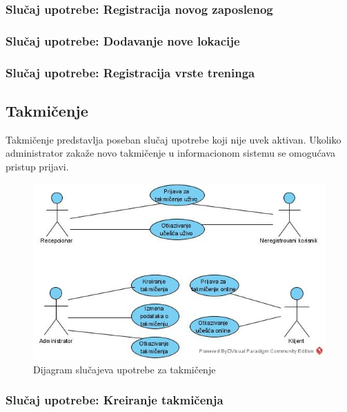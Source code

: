 \documentclass[a4paper]{article}
\begin{document}
\subsubsection{Slučaj upotrebe: Registracija novog zaposlenog}


\subsubsection{Slučaj upotrebe: Dodavanje nove lokacije}


\subsubsection{Slučaj upotrebe: Registracija vrste treninga}


\newpage
\subsection{Takmičenje}
Takmičenje predstavlja poseban slučaj upotrebe koji nije uvek aktivan. Ukoliko administrator zakaže novo takmičenje u informacionom sistemu se omogućava pristup prijavi. 

\begin{figure}[!ht]
\begin{center}
\includegraphics[scale=0.55]{sections/images/dijagram_slucajeva_upotrebe_za_takmicenje.jpg}
\end{center}
\caption{Dijagram slučajeva upotrebe za takmičenje}
\label{fig:kontekst}
\end{figure}

\subsubsection{Slučaj upotrebe: Kreiranje takmičenja}

\end{document}
